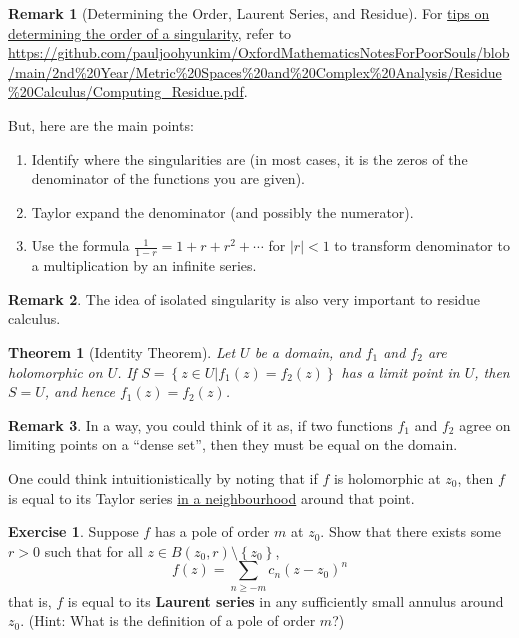 \documentclass[a4paper, 12pt]{article}
\newtheorem{theorem}{Theorem}
\theoremstyle{definition}
\newtheorem{exercise}{Exercise}
\newtheorem{remark}{Remark}
\numberwithin{theorem}{section}
\numberwithin{definition}{section}
\numberwithin{exercise}{section}
\numberwithin{remark}{section}
\numberwithin{figure}{section}
\numberwithin{example}{section}
\begin{document}
\begin{remark}[Determining the Order, Laurent Series, and Residue]
    For \ul{tips on determining the order of a singularity}, refer to \url{https://github.com/pauljoohyunkim/OxfordMathematicsNotesForPoorSouls/blob/main/2nd\%20Year/Metric\%20Spaces\%20and\%20Complex\%20Analysis/Residue\%20Calculus/Computing\_Residue.pdf}.

    But, here are the main points:
    \begin{enumerate}
        \item Identify where the singularities are (in most cases, it is the zeros of the denominator of the functions you are given).
        \item Taylor expand the denominator (and possibly the numerator).
        \item Use the formula $\frac{1}{1-r} = 1 + r + r^2 + \cdots$ for $|r| < 1$ to transform denominator to a multiplication by an infinite series.
    \end{enumerate}
\end{remark}
\begin{remark}
    The idea of isolated singularity is also very important to residue calculus.
\end{remark}
\begin{theorem}[Identity Theorem]
    Let $U$ be a domain, and $f_1$ and $f_2$ are holomorphic on $U$.
    If $S = \left\{ z \in U | f_1(z) = f_2 (z) \right\}$ has a limit point in $U$,
    then $S = U$, and hence $f_1(z) = f_2 (z)$.
\end{theorem}
\begin{remark}
    In a way, you could think of it as, if two functions $f_1$ and $f_2$ agree on limiting points on a ``dense set'',
    then they must be equal on the domain.

    One could think intuitionistically by noting that if $f$ is holomorphic at $z_0$, then
    $f$ is equal to its Taylor series \ul{in a neighbourhood} around that point.
\end{remark}
\begin{exercise}
    Suppose $f$ has a pole of order $m$ at $z_0$.
    Show that there exists some $r > 0$ such that for all $z \in B\left( z_0, r \right) \setminus\left\{ z_0 \right\}$,
    \begin{equation*}
        f(z) = \sum_{n \geq -m} c_n (z-z_0)^n
    \end{equation*}
    that is,
    $f$ is equal to its \textbf{Laurent series} in any sufficiently small annulus around $z_0$.
    (Hint: What is the definition of a pole of order $m$?)
\end{exercise}
\end{document}
